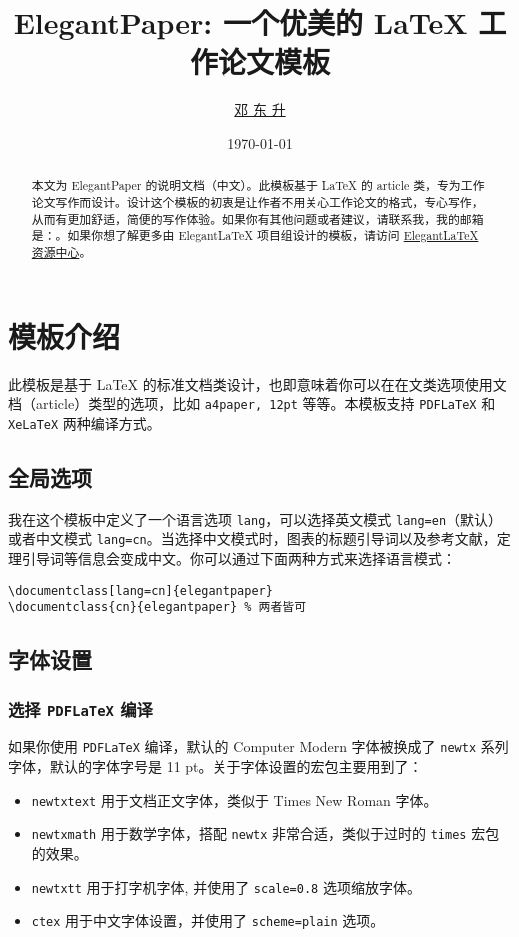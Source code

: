 \documentclass[lang=cn]{elegantpaper}
\title{ElegantPaper: 一个优美的 \LaTeX{} 工作论文模板}
\author{\href{https://ddswhu.me/}{邓 东 升}}
\institute{Elegant\LaTeX{} 项目组}
\date{\today}
\begin{document}
\maketitle

\begin{abstract}
\noindent \sffamily 本文为 ElegantPaper 的说明文档（中文）。此模板基于 \LaTeX{} 的 article 类，专为工作论文写作而设计。设计这个模板的初衷是让作者不用关心工作论文的格式，专心写作，从而有更加舒适，简便的写作体验。如果你有其他问题或者建议，请联系我，我的邮箱是：。如果你想了解更多由 Elegant\LaTeX{} 项目组设计的模板，请访问 \href{https://ddswhu.me/resource/}{Elegant\LaTeX{} 资源中心}。
\end{abstract}

\section{模板介绍}

此模板是基于 \LaTeX{} 的标准文档类设计，也即意味着你可以在在文类选项使用文档（article）类型的选项，比如 \texttt{a4paper, 12pt} 等等。本模板支持 \lstinline{PDFLaTeX} 和 \lstinline{XeLaTeX} 两种编译方式。
      
\subsection{全局选项}
我在这个模板中定义了一个语言选项 \lstinline{lang}，可以选择英文模式 \lstinline{lang=en}（默认）或者中文模式 \lstinline{lang=cn}。当选择中文模式时，图表的标题引导词以及参考文献，定理引导词等信息会变成中文。你可以通过下面两种方式来选择语言模式：
\begin{lstlisting}
\documentclass[lang=cn]{elegantpaper}
\documentclass{cn}{elegantpaper} % 两者皆可
\end{lstlisting}

\subsection{字体设置}
\subsubsection{选择 \lstinline{PDFLaTeX} 编译}
如果你使用 \lstinline{PDFLaTeX} 编译，默认的 Computer Modern 字体被换成了 \lstinline{newtx} 系列字体，默认的字体字号是 11 pt。关于字体设置的宏包主要用到了：
\begin{itemize}
	\item \lstinline{newtxtext} 用于文档正文字体，类似于 Times New Roman 字体。
	\item \lstinline{newtxmath} 用于数学字体，搭配 \lstinline{newtx} 非常合适，类似于过时的 \lstinline{times} 宏包的效果。
	\item \lstinline{newtxtt} 用于打字机字体, 并使用了 \lstinline{scale=0.8} 选项缩放字体。
	\item \lstinline{ctex} 用于中文字体设置，并使用了 \lstinline{scheme=plain} 选项。
\end{itemize}
\end{document}
